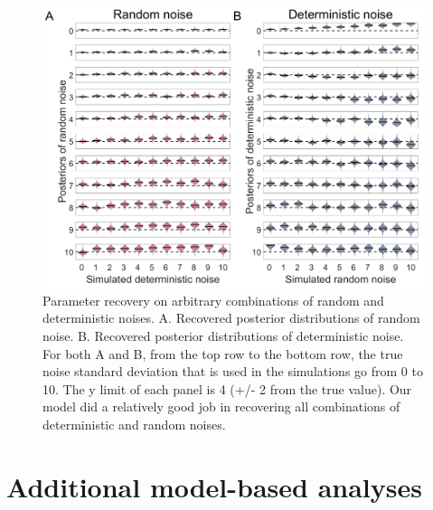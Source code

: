 \documentclass[12pt]{article}
\begin{document}
	\begin{figure}[hp]
		\begin{center}
			\includegraphics[width=1\textwidth]{figures/RDBayes_parameterrecovery_gridsimu_all.jpg}
			\caption{Parameter recovery on arbitrary combinations of random and deterministic noises. A. Recovered posterior distributions of random noise. B. Recovered posterior distributions of deterministic noise. For both A and B, from the top row to the bottom row, the true noise standard deviation that is used in the simulations go from 0 to 10. The y limit of each panel is 4 (+/- 2 from the true value). Our model did a relatively good job in recovering all combinations of deterministic and random noises.}
			\label{fig:gridall}
		\end{center}
	\end{figure} 
	
	\section{Additional model-based analyses}
\end{document}
